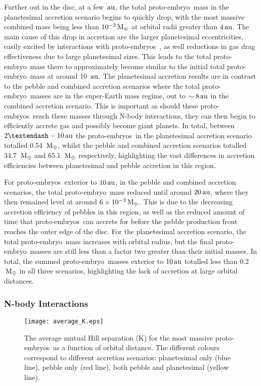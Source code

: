 \documentclass[a4paper,fleqn,usenatbib]{mnras}
\newcommand{\me}{{\, {\rm M}_{\oplus}}}
\newcommand{\au}{{\, {\rm au}}}
\newcommand{\emb}{{{proto-embryo~}}}
\newcommand{\embs}{{{proto-embryos~}}}
\begin{document}
Further out in the disc, at a few $\au$, the total \emb mass in the planetesimal accretion scenario begins to quickly drop, with the most massive combined mass being less than $10^{-2}\me$ at orbital radii greater than $4\au$.
The main cause of this drop in accretion are the larger planetesimal eccentricities, easily excited by interactions with \embs , as well reductions in gas drag effectiveness due to large planetesimal sizes.
This leads to the total \emb mass there to approximately become similar to the initial total \emb mass at around 10 $\au$.
The planetesimal accretion results are in contrast to the pebble and combined accretion scenarios where the total \emb masses are in the super-Earth mass regime, out to $\sim 8 \au$ in the combined accretion scenario.
This is important as should these \embs reach these masses through N-body interactions, they can then begin to efficiently accrete gas and possibly become giant planets.
In total, between $2–-10 \au$ the \embs in the planetesimal accretion scenario totalled 0.54 $\me$, whilst the pebble and combined accretion scenarios totalled 34.7 $\me$ and 65.1 $\me$ respectively, highlighting the vast differences in accretion efficiencies between planetesimal and pebble accretion in this region.

For \embs exterior to $10 \au$, in the pebble and combined accretion scenarios, the total \emb mass reduced until around $20 \au$, where they then remained level at around $6\times 10^{-3} \me$.
This is due to the decreasing accretion efficiency of pebbles in this region, as well as the reduced amount of time that \embs can accrete for before the pebble production front reaches the outer edge of the disc.
For the planetesimal accretion scenario, the total \emb mass increases with orbital radius, but the final \emb masses are still less than a factor two greater than their initial masses.
In total, the summed \emb masses exterior to $10 \au$ totalled less than 0.2 $\me$ in all three scenarios, highlighting the lack of accretion at large orbital distances.

\subsubsection{N-body Interactions}

\begin{figure}
\centering
\texttt{[image: average\_K.eps]}
\caption{The average mutual Hill separation (K) for the most massive \embs as a function of orbital distance. The different colours correspond to different accretion scenarios: planetesimal only (blue line), pebble only (red line), both pebble and planetesimal (yellow line).}
\label{fig:average_K}
\end{figure}
\end{document}
